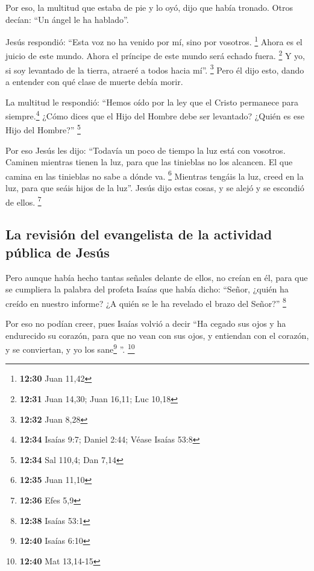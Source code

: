  Por eso, la multitud que estaba de pie y lo oyó, dijo
que había tronado. Otros decían: ``Un ángel le ha hablado''.

 Jesús respondió: ``Esta voz no ha venido por mí, sino
por vosotros. \footnote{\textbf{12:30} Juan 11,42}  Ahora
es el juicio de este mundo. Ahora el príncipe de este mundo será echado
fuera. \footnote{\textbf{12:31} Juan 14,30; Juan 16,11; Luc 10,18}
 Y yo, si soy levantado de la tierra, atraeré a todos
hacia mí''. \footnote{\textbf{12:32} Juan 8,28}  Pero él
dijo esto, dando a entender con qué clase de muerte debía morir.

 La multitud le respondió: ``Hemos oído por la ley que el
Cristo permanece para siempre.\footnote{\textbf{12:34} Isaías 9:7;
  Daniel 2:44; Véase Isaías 53:8} ¿Cómo dices que el Hijo del Hombre
debe ser levantado? ¿Quién es ese Hijo del Hombre?'' \footnote{\textbf{12:34}
  Sal 110,4; Dan 7,14}

 Por eso Jesús les dijo: ``Todavía un poco de tiempo la
luz está con vosotros. Caminen mientras tienen la luz, para que las
tinieblas no los alcancen. El que camina en las tinieblas no sabe a
dónde va. \footnote{\textbf{12:35} Juan 11,10}  Mientras
tengáis la luz, creed en la luz, para que seáis hijos de la luz''. Jesús
dijo estas cosas, y se alejó y se escondió de ellos. \footnote{\textbf{12:36}
  Efes 5,9}

\hypertarget{la-revisiuxf3n-del-evangelista-de-la-actividad-puxfablica-de-jesuxfas}{%
\subsection{La revisión del evangelista de la actividad pública de
Jesús}\label{la-revisiuxf3n-del-evangelista-de-la-actividad-puxfablica-de-jesuxfas}}

 Pero aunque había hecho tantas señales delante de ellos,
no creían en él,  para que se cumpliera la palabra del
profeta Isaías que había dicho: ``Señor, ¿quién ha creído en nuestro
informe? ¿A quién se le ha revelado el brazo del Señor?'' \footnote{\textbf{12:38}
  Isaías 53:1}

 Por eso no podían creer, pues Isaías volvió a decir
 ``Ha cegado sus ojos y ha endurecido su corazón, para
que no vean con sus ojos, y entiendan con el corazón, y se conviertan, y
yo los sane\footnote{\textbf{12:40} Isaías 6:10} ''. \footnote{\textbf{12:40}
  Mat 13,14-15}

